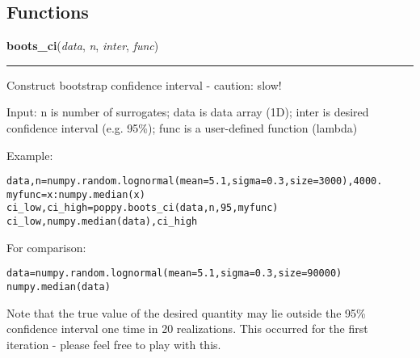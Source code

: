 
  \subsection{Functions}

    \label{spacepy:poppy:boots_ci}

    \vspace{0.5ex}

\hspace{.8\funcindent}\begin{boxedminipage}{\funcwidth}

    \raggedright \textbf{boots\_ci}(\textit{data}, \textit{n}, \textit{inter}, \textit{func})

    \vspace{-1.5ex}

    \rule{\textwidth}{0.5\fboxrule}
\setlength{\parskip}{2ex}
    Construct bootstrap confidence interval - caution: slow!

    Input: n is number of surrogates; data is data array (1D); inter is 
    desired confidence interval (e.g. 95\%); func is a user-defined 
    function (lambda)

    Example:

\begin{alltt}
\pysrcprompt{{\textgreater}{\textgreater}{\textgreater} }data, n = numpy.random.lognormal(mean=5.1, sigma=0.3, size=3000), 4000.
\pysrcprompt{{\textgreater}{\textgreater}{\textgreater} }myfunc =  x: numpy.median(x)
\pysrcprompt{{\textgreater}{\textgreater}{\textgreater} }ci\_low, ci\_high = poppy.boots\_ci(data, n, 95, myfunc)
\pysrcprompt{{\textgreater}{\textgreater}{\textgreater} }ci\_low, numpy.median(data), ci\_high
\end{alltt}
    For comparison:

\begin{alltt}
\pysrcprompt{{\textgreater}{\textgreater}{\textgreater} }data = numpy.random.lognormal(mean=5.1, sigma=0.3, size=90000)
\pysrcprompt{{\textgreater}{\textgreater}{\textgreater} }numpy.median(data)
\end{alltt}
    Note that the true value of the desired quantity may lie outside the 
    95\% confidence interval one time in 20 realizations. This occurred for
    the first iteration - please feel free to play with this.

\setlength{\parskip}{1ex}
    \end{boxedminipage}



